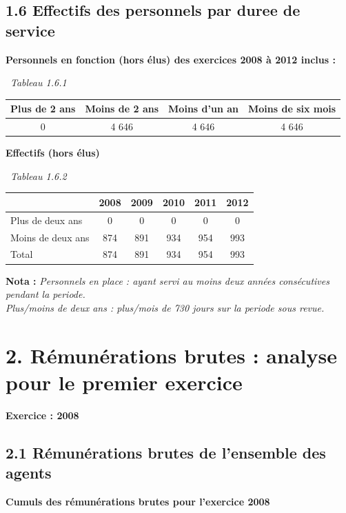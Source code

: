 \hypertarget{effectifs-des-personnels-par-duree-de-service}{%
\subsection{1.6 Effectifs des personnels par duree de
service}\label{effectifs-des-personnels-par-duree-de-service}}

\textbf{Personnels en fonction (hors élus) des exercices 2008 à 2012
inclus :}

~\emph{Tableau 1.6.1}

\begin{longtable}[]{@{}cccc@{}}
\toprule
Plus de 2 ans & Moins de 2 ans & Moins d'un an & Moins de six
mois\tabularnewline
\midrule
\endhead
0 & 4 646 & 4 646 & 4 646\tabularnewline
\bottomrule
\end{longtable}

\textbf{Effectifs (hors élus)}

~\emph{Tableau 1.6.2}

\begin{longtable}[]{@{}lccccc@{}}
\toprule
& 2008 & 2009 & 2010 & 2011 & 2012\tabularnewline
\midrule
\endhead
Plus de deux ans & 0 & 0 & 0 & 0 & 0\tabularnewline
Moins de deux ans & 874 & 891 & 934 & 954 & 993\tabularnewline
Total & 874 & 891 & 934 & 954 & 993\tabularnewline
\bottomrule
\end{longtable}

\textbf{Nota :} \emph{Personnels en place : ayant servi au moins deux
années consécutives pendant la periode.}\\
\emph{Plus/moins de deux ans : plus/mois de 730 jours sur la periode
sous revue.}

\hypertarget{remunerations-brutes-analyse-pour-le-premier-exercice}{%
\section{2. Rémunérations brutes : analyse pour le premier
exercice}\label{remunerations-brutes-analyse-pour-le-premier-exercice}}

\textbf{Exercice : 2008 }

\hypertarget{remunerations-brutes-de-lensemble-des-agents}{%
\subsection{2.1 Rémunérations brutes de l'ensemble des
agents}\label{remunerations-brutes-de-lensemble-des-agents}}

\textbf{Cumuls des rémunérations brutes pour l'exercice 2008 }

